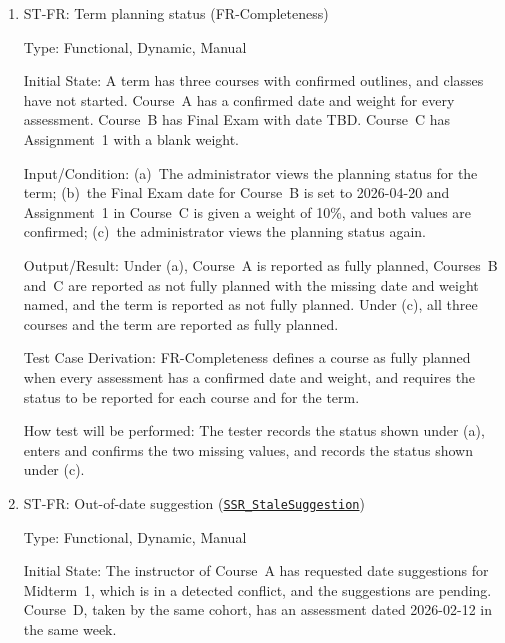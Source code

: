 \documentclass[12pt, titlepage]{article}
\newcounter{stnum}
\newcommand{\halink}[1]{\href{https://github.com/shivyam/cas-course-optimization/blob/main/pdfs/HazardAnalysis/HazardAnalysis.pdf}{#1}}
\newcommand{\frlink}[1]{\href{https://github.com/shivyam/cas-course-optimization/blob/main/pdfs/SRS-IEEE/SRS.pdf}{FR#1}}
\begin{document}
\begin{enumerate}
Test Case Derivation: FR-Override allows an administrator to accept a finding with a reason, and requires the administrator, time, and reason to be recorded. \frlink{16} limits instructors to their own course data, which does not include findings.

How test will be performed: The tester performs (a) to (c) through the web interface, then checks the dashboard status of both findings and the stored record for (a).


\item{ST-FR\thestnum \label{ST_Completeness}: Term planning status (FR-Completeness)\\}

Type: Functional, Dynamic, Manual

Initial State: A term has three courses with confirmed outlines, and classes have not started. Course~A has a confirmed date and weight for every assessment. Course~B has Final Exam with date TBD. Course~C has Assignment~1 with a blank weight.

Input/Condition: (a)~The administrator views the planning status for the term; (b)~the Final Exam date for Course~B is set to 2026-04-20 and Assignment~1 in Course~C is given a weight of 10\%, and both values are confirmed; (c)~the administrator views the planning status again.

Output/Result: Under (a), Course~A is reported as fully planned, Courses~B and~C are reported as not fully planned with the missing date and weight named, and the term is reported as not fully planned. Under (c), all three courses and the term are reported as fully planned.

Test Case Derivation: FR-Completeness defines a course as fully planned when every assessment has a confirmed date and weight, and requires the status to be reported for each course and for the term.

How test will be performed: The tester records the status shown under (a), enters and confirms the two missing values, and records the status shown under (c).


\item{ST-FR\thestnum \label{ST_StaleSuggestion}: Out-of-date suggestion (\halink{\texttt{SSR\_StaleSuggestion}})\\}

Type: Functional, Dynamic, Manual

Initial State: The instructor of Course~A has requested date suggestions for Midterm~1, which is in a detected conflict, and the suggestions are pending. Course~D, taken by the same cohort, has an assessment dated 2026-02-12 in the same week.


\end{enumerate}
\end{document}
